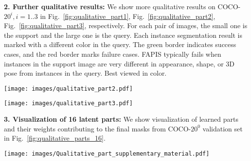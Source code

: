 \documentclass[final]{cvpr}
\begin{document}
\textbf{2. Further qualitative results: }
We show more qualitative results on COCO-$20^i, i=1..3$ in 
Fig.~\ref{fig:qualitative_part1},
Fig.~\ref{fig:qualitative_part2},
Fig.~\ref{fig:qualitative_part3}, respectively. 
For each pair of images, the small one is the support and the large one is the query. Each instance segmentation result is marked with a different color in the query. The green border indicates success cases, and the red border marks failure cases. FAPIS typically fails when instances in the support image are very different in appearance, shape, or 3D pose from instances in the query.  Best viewed in color.




\begin{figure*}[h!]
    \centering
    \texttt{[image: images/qualitative\_part2.pdf]}
    \caption{Our one-shot instance segmentation on COCO-$20^2$.}
    \label{fig:qualitative_part2}
\end{figure*}


\begin{figure*}[h!]
    \centering
    \texttt{[image: images/qualitative\_part3.pdf]}
    \vspace{10pt}
    \caption{Our one-shot instance segmentation on COCO-$20^3$.}
    \label{fig:qualitative_part3}
\end{figure*}


\textbf{3. Visualization of 16 latent parts:}
% 
We show visualization of learned parts and their weights contributing to the final masks from COCO-$20^0$ validation set in Fig.~\ref{fig:qualitative_parts_16}.

\begin{figure*}[h!]
    \centering
    \texttt{[image: images/Qualitative\_part\_supplementary\_material.pdf]}
    \vspace{-10pt}
    \caption{Visualization of 16 latent parts for both training (upper) and test (lower) classes from COCO-$20^0$ validation set. From left to right: (a) input image, (b) GT segmentation, (c) predicted segmentation, (d) 16 predicted object parts. The predicted importance of the parts is color-coded from blue (smallest) to green (largest).}
    \label{fig:qualitative_parts_16}
\end{figure*}
\end{document}
